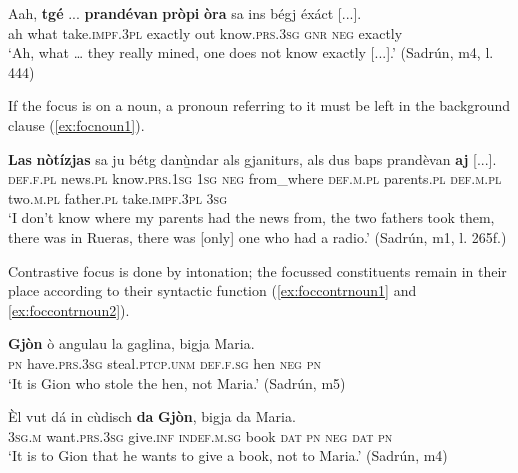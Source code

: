 \ea
\label{ex:focclause2}
\gll   Aah, \textbf{tgé} ... \textbf{prandévan} \textbf{pròpi} \textbf{òra} sa ins bégj éxáct [...]. \\
ah what {} take.\textsc{impf.3pl} exactly out know.\textsc{prs.3sg} \textsc{gnr} \textsc{neg} exactly\\
\glt `Ah, what … they really mined, one does not know exactly [...].' (Sadrún, m4, l. 444)
\z

If the focus is on a noun, a pronoun referring to it must be left in the background clause (\ref{ex:focnoun1}).

\ea
\label{ex:focnoun1}
\gll  \textbf{Las} \textbf{nòtízjas} sa ju bétg danù̱ndar als gjaniturs, als dus baps prandèvan \textbf{aj} [...]. \\
\textsc{def.f.pl} news.\textsc{pl} know.\textsc{prs.1sg} \textsc{1sg} \textsc{neg} from\_where \textsc{def.m.pl} parents.\textsc{pl} \textsc{def.m.pl} two.\textsc{m.pl} father.\textsc{pl} take.\textsc{impf.3pl} \textsc{3sg}\\
\glt `I don’t know where my parents had the news from, the two fathers took them, there was in Rueras, there was [only] one who had a radio.' (Sadrún, m1, l. 265f.)
\z

Contrastive focus is done by intonation; the focussed constituents remain in their place according to their syntactic function (\ref{ex:foccontrnoun1} and \ref{ex:foccontrnoun2}).

\ea
\label{ex:foccontrnoun1}
\gll \textbf{Gjòn} ò angulau la gaglina, bigja Maria.\\
\textsc{pn} have.\textsc{prs.3sg} steal.\textsc{ptcp.unm} \textsc{def.f.sg} hen \textsc{neg} \textsc{pn}\\
\glt `It is Gion who stole the hen, not Maria.' (Sadrún, m5)
\z

\ea
\label{ex:foccontrnoun2}
\gll Èl vut dá in cùdisch \textbf{da} \textbf{Gjòn}, bigja da Maria.\\
\textsc{3sg.m} want.\textsc{prs.3sg} give.\textsc{inf} \textsc{indef.m.sg} book \textsc{dat} \textsc{pn} \textsc{neg} \textsc{dat} \textsc{pn}\\
\glt `It is to Gion that he wants to give a book, not to Maria.' (Sadrún, m4)
\z







